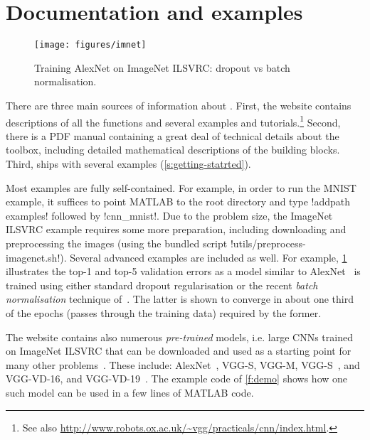 \section{Documentation and examples}\label{s:examples}

\begin{figure}
\centering
\texttt{[image: figures/imnet]}
\vspace{-1em}
\caption{Training AlexNet on ImageNet ILSVRC: dropout vs batch normalisation.}\label{f:imnet}
\end{figure}

There are three main sources of information about \matconvnet. First, the website contains descriptions of all the functions and several examples and tutorials.\footnote{\small See also \url{http://www.robots.ox.ac.uk/~vgg/practicals/cnn/index.html}.} Second, there is a PDF manual containing a great deal of technical details about the toolbox, including detailed mathematical descriptions of the building blocks. Third, \matconvnet ships with several examples (\cref{s:getting-statrted}).

Most examples are fully self-contained. For example, in order to run the MNIST example, it suffices to point MATLAB to the \matconvnet root directory and type !addpath examples! followed by !cnn_mnist!. Due to the problem size, the ImageNet ILSVRC example requires some more preparation, including downloading and preprocessing the images (using the bundled script !utils/preprocess-imagenet.sh!). Several advanced examples are included as well. For example, \cref{f:imnet} illustrates the top-1 and top-5 validation errors as a model similar to AlexNet~\cite{krizhevsky12imagenet} is trained using either standard dropout regularisation or the recent \emph{batch normalisation} technique of~\cite{ioffe15batch}. The latter is shown to converge in about one third of the epochs (passes through the training data) required by the former.

The \matconvnet website contains also numerous \emph{pre-trained} models, i.e. large CNNs trained on ImageNet ILSVRC that can be downloaded and used as a starting point for many other problems~\cite{chatfield14return}. These include: AlexNet~\cite{krizhevsky12imagenet}, VGG-S, VGG-M,  VGG-S~\cite{chatfield14return}, and  VGG-VD-16, and VGG-VD-19~\cite{simonyan14very}.  The example code of \cref{f:demo} shows how one such model can be used in a few lines of MATLAB code.

